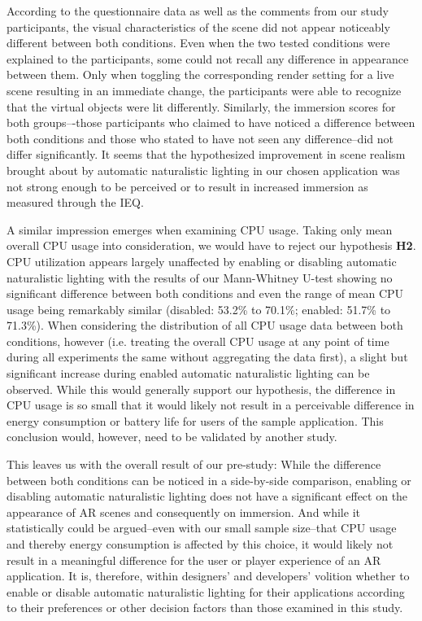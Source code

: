 \documentclass[12pt,twoside,english]{article}
\begin{document}
According to the questionnaire data as well as the comments from our study participants, the visual characteristics of the scene did not appear noticeably different between both conditions.
Even when the two tested conditions were explained to the participants, some could not recall any difference in appearance between them.
Only when toggling the corresponding render setting for a live scene resulting in an immediate change, the participants were able to recognize that the virtual objects were lit differently.
Similarly, the immersion scores for both groups–-those participants who claimed to have noticed a difference between both conditions and those who stated to have not seen any difference--did not differ significantly.
It seems that the hypothesized improvement in scene realism brought about by automatic naturalistic lighting in our chosen application was not strong enough to be perceived or to result in increased immersion as measured through the \gls{IEQ}.

A similar impression emerges when examining \gls{CPU} usage.
Taking only mean overall \gls{CPU} usage into consideration, we would have to reject our hypothesis \textbf{H2}.
\gls{CPU} utilization appears largely unaffected by enabling or disabling automatic naturalistic lighting with the results of our Mann-Whitney U-test showing no significant difference between both conditions and even the range of mean \gls{CPU} usage being remarkably similar (disabled: 53.2\% to 70.1\%; enabled: 51.7\% to 71.3\%).
When considering the distribution of all \gls{CPU} usage data between both conditions, however (i.e. treating the overall \gls{CPU} usage at any point of time during all experiments the same without aggregating the data first), a slight but significant increase during enabled automatic naturalistic lighting can be observed.
While this would generally support our hypothesis, the difference in \gls{CPU} usage is so small that it would likely not result in a perceivable difference in energy consumption or battery life for users of the sample application.
This conclusion would, however, need to be validated by another study.

This leaves us with the overall result of our pre-study:
While the difference between both conditions can be noticed in a side-by-side comparison, enabling or disabling automatic naturalistic lighting does not have a significant effect on the appearance of \gls{AR} scenes and consequently on immersion.
And while it statistically could be argued--even with our small sample size--that \gls{CPU} usage and thereby energy consumption is affected by this choice, it would likely not result in a meaningful difference for the user or player experience of an \gls{AR} application.
It is, therefore, within designers' and developers' volition whether to enable or disable automatic naturalistic lighting for their applications according to their preferences or other decision factors than those examined in this study.
\end{document}
